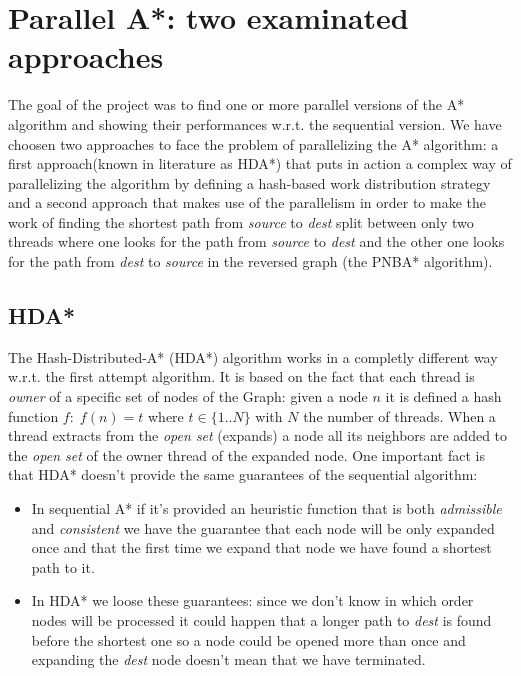 \documentclass[twocolumn, switch]{article} %
\begin{document}
\section{Parallel A*: two examinated approaches}
The goal of the project was to find one or more parallel versions of the A* algorithm 
and showing their performances w.r.t. the sequential version. We have choosen two approaches
to face the problem of parallelizing the A* algorithm: a first approach(known in literature as HDA*) that puts in action a
complex way of parallelizing the algorithm by defining a hash-based work distribution strategy and
a second approach that makes use of the parallelism in order to make the work of
finding the shortest path from \textit{source} to \textit{dest} split between only two threads
where one looks for the path from \textit{source} to \textit{dest} and the other one looks
for the path from \textit{dest} to \textit{source} in the reversed graph (the PNBA* algorithm).

\subsection{HDA*}
The Hash-Distributed-A* (HDA*) algorithm works in a completly different way w.r.t. the 
first attempt algorithm. It is based on the fact that each thread is \textit{owner} of a
specific set of nodes of the Graph: given a node $n$ it is defined a hash function $f:\;f(n) = t$
where $t \in \{1..N\}$ with $N$ the number of threads. When a thread extracts from the \textit{open set}
(expands) a node all its neighbors are added to the \textit{open set} of the owner thread of the expanded node. 
One important fact is that HDA* doesn't provide the same guarantees of the sequential algorithm:
\begin{itemize}
  \item In sequential A* if it's provided an heuristic function that is both \textit{admissible}
        and \textit{consistent} we have the guarantee that each node will be only expanded once
        and that the first time we expand that node we have found a shortest path to it.
  \item In HDA* we loose these guarantees: since we don't know in which order nodes will be processed
        it could happen that a longer path to \textit{dest} is found before the shortest one so
        a node could be opened more than once and expanding the \textit{dest} node doesn't
        mean that we have terminated.
\end{itemize}
\end{document}
